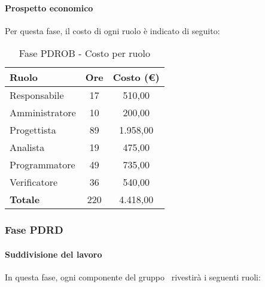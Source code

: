 \documentclass[../PianoProgetto.tex]{subfiles}
\begin{document}
	\paragraph{Prospetto economico}
					Per questa fase, il costo di ogni ruolo è indicato di seguito:
	\begin{table}[h]
		\centering
	
		\begin{tabular}{l * {2}{c}}
			\toprule
			\textbf{Ruolo} & \textbf{Ore} & \textbf{Costo (\euro{})} \\
			\midrule
			Responsabile &	17 & 510,00 \\
			Amministratore & 10 & 200,00 \\
			Progettista & 89 & 1.958,00 \\
			Analista & 19 & 475,00 \\
			Programmatore & 49 & 735,00 \\
			Verificatore & 36 & 540,00 \\
			\midrule		
			\textbf{Totale} & 220 & 4.418,00 \\
			\bottomrule
			
		\end{tabular}
		
		\caption{Fase PDROB - Costo per ruolo}
		\label{tab:fasePDROB_costo}
		
	\end{table}
	
	\subsubsection{Fase PDRD}
				\paragraph{Suddivisione del lavoro}
					In questa fase, ogni componente del gruppo \leaf\ rivestirà i seguenti ruoli:
	
\end{document}
